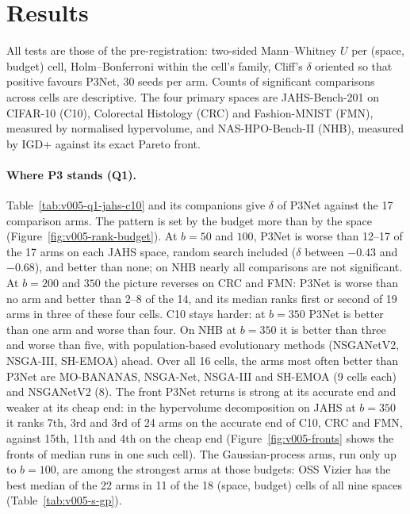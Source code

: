 
\section{Results}
\label{sec:results}

All tests are those of the pre-registration: two-sided Mann--Whitney $U$ per (space, budget) cell, Holm--Bonferroni
within the cell's family, Cliff's $\delta$ oriented so that positive favours P3Net, 30 seeds per arm. Counts of
significant comparisons across cells are descriptive. The four primary spaces are JAHS-Bench-201 on CIFAR-10 (C10),
Colorectal Histology (CRC) and Fashion-MNIST (FMN), measured by normalised hypervolume, and NAS-HPO-Bench-II (NHB),
measured by IGD+ against its exact Pareto front.

\paragraph{Where P3 stands (Q1).} Table~\ref{tab:v005-q1-jahs-c10} and its companions give $\delta$ of P3Net against
the 17 comparison arms. The pattern is set by the budget more than by the space (Figure~\ref{fig:v005-rank-budget}). At $b = 50$ and $100$, P3Net is worse
than 12--17 of the 17 arms on each JAHS space, random search included ($\delta$ between $-0.43$ and $-0.68$), and
better than none; on NHB nearly all comparisons are not significant. At $b = 200$ and $350$ the picture reverses on
CRC and FMN: P3Net is worse than no arm and better than 2--8 of the 14, and its median ranks first or second of 19
arms in three of these four cells. C10 stays harder: at $b = 350$ P3Net is better than one arm and worse than four.
On NHB at $b = 350$ it is better than three and worse than five, with population-based evolutionary methods
(NSGANetV2, NSGA-III, SH-EMOA) ahead. Over all 16 cells, the arms most often better than P3Net are MO-BANANAS,
NSGA-Net, NSGA-III and SH-EMOA (9 cells each) and NSGANetV2 (8). The front P3Net returns is strong at its accurate end
and weaker at its cheap end: in the hypervolume decomposition on JAHS at $b = 350$ it ranks 7th, 3rd and 3rd of 24
arms on the accurate end of C10, CRC and FMN, against 15th, 11th and 4th on the cheap end
(Figure~\ref{fig:v005-fronts} shows the fronts of median runs in one such cell). The Gaussian-process
arms, run only up to $b = 100$, are among the strongest arms at those budgets: OSS Vizier has the best median of the 22 arms in 11 of
the 18 (space, budget) cells of all nine spaces (Table~\ref{tab:v005-s-gp}).

